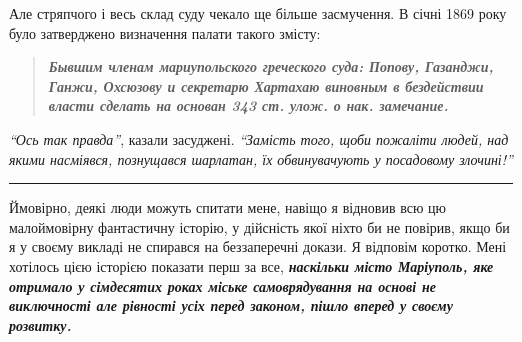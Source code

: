 \documentclass[a4paper,20pt]{report}
\begin{document}
Але стряпчого і весь склад суду чекало ще більше засмучення. В січні 1869 року було затверджено визначення палати
такого змісту:

\begin{quote}
\em\bfseries
Бывшим членам мариупольского
греческого суда: Попову, Газанджи, Ганжи, Охсюзову и
секретарю Хартахаю виновным в бездействии власти сделать на основан 343 ст. улож. о нак. замечание.
\end{quote}

\emph{``Ось так правда''}, казали засуджені. \emph{``Замість того, щоби пожаліти людей,
над якими насміявся, познущався шарлатан, їх обвинувачують у посадовому злочині!''}


\par\noindent\rule{\textwidth}{0.4pt}

Ймовірно, деякі люди можуть спитати мене, навіщо я відновив всю цю малоймовірну
фантастичну історію, у дійсність якої ніхто би не повірив, якщо би я у своєму викладі
не спирався на беззаперечні докази. Я відповім коротко. Мені хотілось цією історією
показати перш за все, \textbf{\emph{наскільки місто Маріуполь, яке отримало у сімдесятих роках міське самоврядування
на основі не виключності але рівності усіх перед законом, пішло вперед у своєму розвитку.}}
\end{document}
